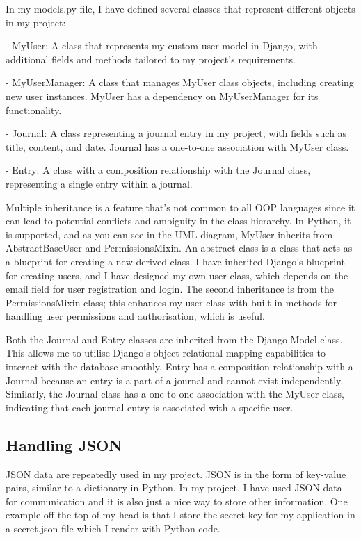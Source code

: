 In my models.py file, I have defined several classes that represent different objects in my project:

- MyUser: A class that represents my custom user model in Django, with additional fields and methods tailored to my project's requirements. 

- MyUserManager: A class that manages MyUser class objects, including creating new user instances. MyUser has a dependency on MyUserManager for its functionality.

- Journal: A class representing a journal entry in my project, with fields such as title, content, and date. Journal has a one-to-one association with MyUser class.

- Entry: A class with a composition relationship with the Journal class, representing a single entry within a journal.

Multiple inheritance is a feature that's not common to all OOP languages since it can lead to potential conflicts and ambiguity in the class hierarchy. In Python, it is supported, and as you can see in the UML diagram, MyUser inherits from AbstractBaseUser and PermissionsMixin. An abstract class is a class that acts as a blueprint for creating a new derived class. I have inherited Django's blueprint for creating users, and I have designed my own user class, which depends on the email field for user registration and login. The second inheritance is from the PermissionsMixin class; this enhances my user class with built-in methods for handling user permissions and authorisation, which is useful. 

Both the Journal and Entry classes are inherited from the Django Model class. This allows me to utilise Django's object-relational mapping capabilities to interact with the database smoothly. Entry has a composition relationship with a Journal because an entry is a part of a journal and cannot exist independently. Similarly, the Journal class has a one-to-one association with the MyUser class, indicating that each journal entry is associated with a specific user.

\subsection{Handling JSON}
JSON data are repeatedly used in my project. JSON is in the form of key-value pairs, similar to a dictionary in Python. In my project, I have used JSON data for communication and it is also just a nice way to store other information. One example off the top of my head is that I store the secret key for my application in a secret.json file which I render with Python code.

